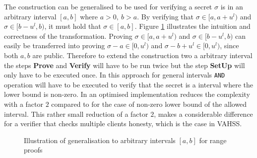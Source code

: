The construction can be generalised to be used for verifying a secret $\sigma$ is in an arbitrary interval $[a,b]$ where $a>0, \:b>a$.  By verifying that $\sigma\in[a,a+u^l)$ and $\sigma\in[b-u^l,b)$, it must hold that $\sigma\in[a,b]$. Figure \ref{fig:interval} illustrates the intuition and correctness of the transformation.  Proving $\sigma\in[a,a+u^l)$ and $\sigma\in[b-u^l,b)$ can easily be transferred into proving $\sigma-a\in[0,u^l)$ and $\sigma-b+u^l\in[0,u^l)$, since both $a,b$ are public. Therefore to extend the construction two a arbitrary interval the steps \textbf{Prove} and \textbf{Verify} will have to be run twice but the step \textbf{SetUp} will only have to be executed once. In this approach for general intervals \texttt{AND} operation will have to be executed to verify that the secret is a interval where the lower bound is non-zero. In \cite{arbitary_range_opt} an optimised implementation reduces the complexity with a factor $2$ compared to \cite{RANGE-SET} for the case of non-zero lower bound of the allowed interval. This rather small reduction of a factor $2$, makes a considerable difference for a verifier that checks multiple clients honesty, which is the case in VAHSS.

\begin{figure}[]
    \centering
    \caption{Illustration of generalisation to arbitrary intervals $[a,b]$ for range proofs}
    \label{fig:interval}
\end{figure}


